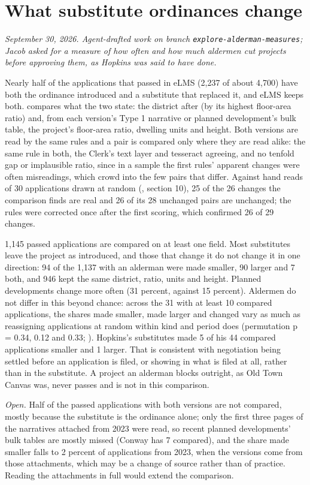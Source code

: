 \clearpage
\section*{What substitute ordinances change}
\textit{September 30, 2026. Agent-drafted work on branch \texttt{explore-alderman-measures}; Jacob asked for a measure
of how often and how much aldermen cut projects before approving them, as Hopkins was said to have done.}

Nearly half of the applications that passed in eLMS (2,237 of about 4,700) have both the ordinance introduced and a
substitute that replaced it, and eLMS keeps both.  compares what the two
state: the district after (by its highest floor-area ratio) and, from each version's Type 1 narrative or planned
development's bulk table, the project's floor-area ratio, dwelling units and height. Both versions are read by the
same rules and a pair is compared only where they are read alike: the same rule in both, the Clerk's text layer and
tesseract agreeing, and no tenfold gap or implausible ratio, since in a sample the first rules' apparent changes were
often misreadings, which crowd into the few pairs that differ. Against hand reads of 30 applications drawn at random
(, section 10), 25 of the 26 changes the comparison finds are real and 26
of its 28 unchanged pairs are unchanged; the rules were corrected once after the first scoring, which confirmed 26 of
29 changes.

1,145 passed applications are compared on at least one field. Most substitutes leave the project as introduced, and
those that change it do not change it in one direction: 94 of the 1,137 with an alderman were made smaller, 90 larger
and 7 both, and 946 kept the same district, ratio, units and height. Planned developments change more often (31
percent, against 15 percent). Aldermen do not differ in this beyond chance: across the 31 with at least 10 compared
applications, the shares made smaller, made larger and changed vary as much as reassigning applications at random
within kind and period does (permutation p = 0.34, 0.12 and 0.33; ).
Hopkins's substitutes made 5 of his 44 compared applications smaller and 1 larger. That is consistent with negotiation
being settled before an application is filed, or showing in what is filed at all, rather than in the substitute. A
project an alderman blocks outright, as Old Town Canvas was, never passes and is not in this comparison.

\textit{Open.} Half of the passed applications with both versions are not compared, mostly because the substitute is
the ordinance alone; only the first three pages of the narratives attached from 2023 were read, so recent planned
developments' bulk tables are mostly missed (Conway has 7 compared), and the share made smaller falls to 2 percent of
applications from 2023, when the versions come from those attachments, which may be a change of source rather than of
practice. Reading the attachments in full would extend the comparison.
